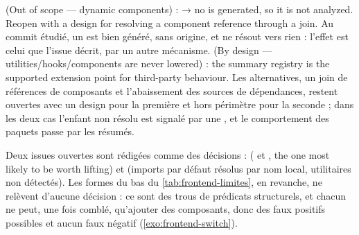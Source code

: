 \begin{decision}
 (\og Out of scope — dynamic components\fg{}) : \og {} → no  is generated, so it is not analyzed. Reopen with a design for resolving a component reference through a join.\fg{} Au commit étudié, un   est bien généré, sans origine, et ne résout vers rien : l'effet est celui que l'issue décrit, par un autre mécanisme.  (\og By design —  utilities/hooks/components are never lowered\fg{}) : \og the summary registry is the supported extension point for third-party behaviour\fg{}. Les alternatives, un join de références de composants et l'abaissement des sources de dépendances, restent ouvertes \og avec un design\fg{} pour la première et hors périmètre pour la seconde ; dans les deux cas l'enfant non résolu est signalé par une \Info{} , et le comportement des paquets passe par les résumés.
\end{decision}

Deux issues ouvertes sont rédigées comme des décisions :  ( et , \og the one most likely to be worth lifting\fg{}) et  (imports par défaut résolus par nom local, utilitaires  non détectés). Les formes du bas du \cref{tab:frontend-limites}, en revanche, ne relèvent d'aucune décision : ce sont des trous de prédicats structurels, et chacun ne peut, une fois comblé, qu'ajouter des composants, donc des faux positifs possibles et aucun faux négatif (\cref{exo:frontend-switch}).

